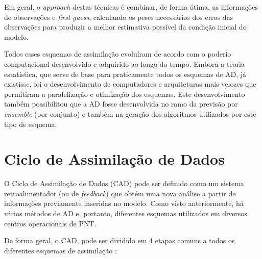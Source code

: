Em geral, o \textit{approach} destas técnicas é combinar, de forma ótima, as informações de observações e \textit{first guess}, calculando os peses necessários dos erros das observações para produzir a melhor estimativa possível da condição inicial do modelo.

Todos esses esquemas de assimilação evoluíram de acordo com o poderio computacional desenvolvido e adquirido ao longo do tempo. Embora a teoria estatística, que serve de base para praticamente todos os esquemas de AD, já existisse, foi o desenvolvimento de computadores e arquiteturas mais velozes que permitiram a paralelização e otimização dos esquemas. Este desenvolvimento também possibilitou que a AD fosse desenvolvida no ramo da previsão por \textit{ensemble} (por conjunto) e também na geração dos algoritmos utilizados por este tipo de esquema.

\section{Ciclo de Assimilação de Dados}
\label{ss:cicloassimdados}

O Ciclo de Assimilação de Dados (CAD) pode ser definido como um sistema \-re\-tro\-a\-li\-men\-ta\-dor (ou de \textit{feedback}) que obtém uma nova análise a partir de informações previamente inseridas no modelo. Como visto anteriormente, há vários métodos de AD e, portanto, diferentes esquemas utilizados em diversos centros operacionais de PNT.

De forma geral, o CAD, pode ser dividido em 4 etapas comuns a todos os diferentes esquemas de assimilação \cite{nowosad01}:

